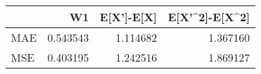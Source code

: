 \begin{tabular}{lrrr}
\toprule
{} &        W1 &  E[X']-E[X] &  E[X'\textasciicircum 2]-E[X\textasciicircum 2] \\
\midrule
MAE &  0.543543 &    1.114682 &        1.367160 \\
MSE &  0.403195 &    1.242516 &        1.869127 \\
\bottomrule
\end{tabular}

